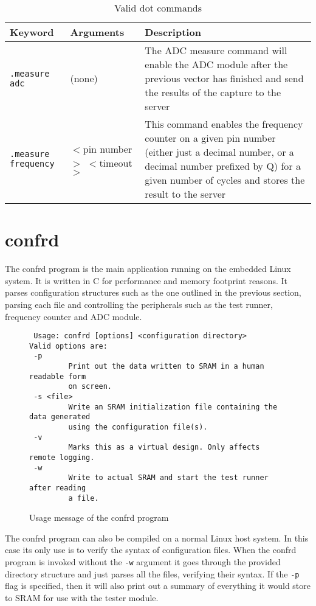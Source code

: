 \begin{table}[h!]
\centering
\begin{tabular}{ | l | l | p{5cm} | }
 \hline
   Keyword       & Arguments & Description \\
 \hline
   \texttt{.measure adc} & (none) & The ADC measure command will enable the ADC module after the previous vector has finished and send the results of the capture to the server \\
 \hline
   \texttt{.measure frequency} & $<$pin number$>$ $<$timeout$>$ & This command enables the frequency counter on a given pin number (either just a decimal number, or a decimal number prefixed by Q) for a given number of cycles and stores the result to the server\\
 \hline
\end{tabular}
\caption{Valid dot commands}
\label{table:dot_commands}
\end{table}


\newpage
\section{confrd}
The confrd program is the main application running on the embedded Linux system. It
is written in C for performance and memory footprint reasons.
It parses configuration structures such as the one outlined in the previous section, parsing
each file and controlling the peripherals such as the test runner, frequency counter and
ADC module.

\begin{figure}[h!]
\lstset{basicstyle=\scriptsize\ttfamily}
\begin{lstlisting}
 Usage: confrd [options] <configuration directory>
Valid options are:
 -p
         Print out the data written to SRAM in a human readable form
         on screen.
 -s <file>
         Write an SRAM initialization file containing the data generated
         using the configuration file(s).
 -v
         Marks this as a virtual design. Only affects remote logging.
 -w
         Write to actual SRAM and start the test runner after reading
         a file.
\end{lstlisting}
\caption{Usage message of the confrd program}
\end{figure}


The confrd program can also be compiled on a normal Linux host system. In this case its
only use is to verify the syntax of configuration files. When the confrd program is
invoked without the \texttt{-w} argument it goes through the provided directory
structure and just parses all the files, verifying their syntax. If the \texttt{-p} flag
is specified, then it will also print out a summary of everything it would store to SRAM for
use with the tester module.
\\

